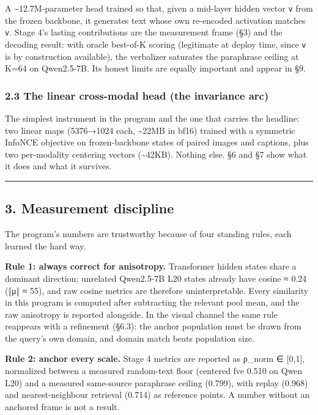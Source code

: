 \documentclass[
  11pt,
]{article}
\begin{document}
A \textasciitilde12.7M-parameter head trained so that, given a mid-layer
hidden vector \texttt{v} from the frozen backbone, it generates text
whose own re-encoded activation matches \texttt{v}. Stage 4's lasting
contributions are the measurement frame (§3) and the decoding result:
with oracle best-of-K scoring (legitimate at deploy time, since
\texttt{v} is by construction available), the verbalizer saturates the
paraphrase ceiling at K=64 on Qwen2.5-7B. Its honest limits are equally
important and appear in §9.

\subsubsection{2.3 The linear cross-modal head (the invariance
arc)}\label{the-linear-cross-modal-head-the-invariance-arc}

The simplest instrument in the program and the one that carries the
headline: two linear maps (5376→1024 each, \textasciitilde22MB in bf16)
trained with a symmetric InfoNCE objective on frozen-backbone states of
paired images and captions, plus two per-modality centering vectors
(\textasciitilde42KB). Nothing else. §6 and §7 show what it does and
what it survives.

\begin{center}\rule{0.5\linewidth}{0.5pt}\end{center}

\subsection{3. Measurement discipline}\label{measurement-discipline}

The program's numbers are trustworthy because of four standing rules,
each learned the hard way.

\textbf{Rule 1: always correct for anisotropy.} Transformer hidden
states share a dominant direction; unrelated Qwen2.5-7B L20 states
already have cosine ≈ 0.24 (‖μ‖ ≈ 55), and raw cosine metrics are
therefore uninterpretable. Every similarity in this program is computed
after subtracting the relevant pool mean, and the raw anisotropy is
reported alongside. In the visual channel the same rule reappears with a
refinement (§6.3): the anchor population must be drawn from the query's
own domain, and domain match beats population size.

\textbf{Rule 2: anchor every scale.} Stage 4 metrics are reported as
ρ\_norm ∈ {[}0,1{]}, normalized between a measured random-text floor
(centered fve 0.510 on Qwen L20) and a measured same-source paraphrase
ceiling (0.799), with replay (0.968) and nearest-neighbour retrieval
(0.714) as reference points. A number without an anchored frame is not a
result.
\end{document}
